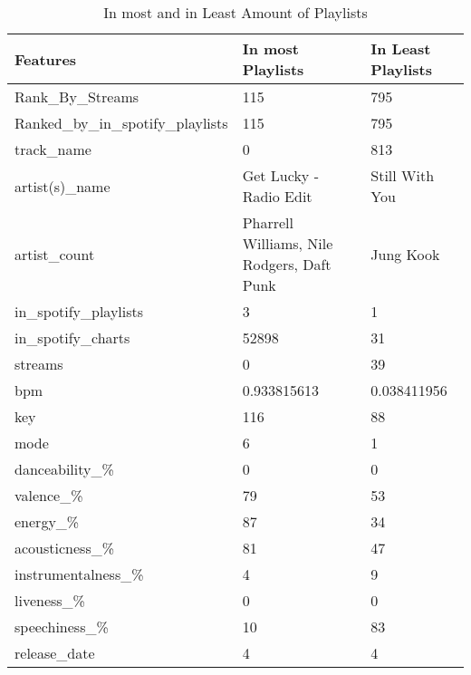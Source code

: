 \documentclass[titlepage]{article}
\begin{document}
\begin{table}[H]
    \centering
    \caption{In most and in Least Amount of Playlists}
    \begin{tabular}{lll}
    \hline
        Features & In most Playlists & In Least Playlists \\ \hline
        Rank\_By\_Streams & 115 & 795 \\ 
        Ranked\_by\_in\_spotify\_playlists & 115 & 795 \\ 
        track\_name & 0 & 813 \\ 
        artist(s)\_name & Get Lucky - Radio Edit & Still With You \\ 
        artist\_count & Pharrell Williams, Nile Rodgers, Daft Punk & Jung Kook \\ 
        in\_spotify\_playlists & 3 & 1 \\ 
        in\_spotify\_charts & 52898 & 31 \\ 
        streams & 0 & 39 \\ 
        bpm & 0.933815613 & 0.038411956 \\ 
        key & 116 & 88 \\ 
        mode & 6 & 1 \\ 
        danceability\_\% & 0 & 0 \\ 
        valence\_\% & 79 & 53 \\ 
        energy\_\% & 87 & 34 \\ 
        acousticness\_\% & 81 & 47 \\ 
        instrumentalness\_\% & 4 & 9 \\ 
        liveness\_\% & 0 & 0 \\ 
        speechiness\_\% & 10 & 83 \\ 
        release\_date & 4 & 4 \\ \hline
    \end{tabular}
\end{table}
\end{document}
